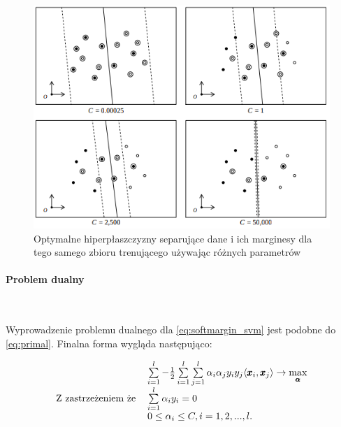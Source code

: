 \documentclass[paper=a4, fontsize=11pt]{scrartcl} %
\numberwithin{equation}{section} %
\numberwithin{figure}{section} %
\newcommand{\myparagraph}[1]{\paragraph{#1}\mbox{}\\}
\begin{document}
    \begin{figure}[H] 
        \begin{center}
            \includegraphics[scale=0.8]{./img/param_c_change.png}
            \caption{Optymalne hiperpłaszczyzny separujące dane i ich marginesy dla tego samego
            zbioru trenującego używając różnych parametrów \cite{nefedov2016support}}
            \label{fig:param_c_change}
        \end{center}
    \end{figure}

\myparagraph{Problem dualny}
    \par Wyprowadzenie problemu dualnego dla \ref{eq:softmargin_svm} jest podobne do
    \ref{eq:primal}. Finalna forma wygląda następująco:

    \begin{equation}
        \begin{tabular}{rl}
            & $\sum\limits_{i=1}^{l} -
            \frac{1}{2}\sum\limits_{i=1}^{l}\sum\limits_{j=1}^{l}\alpha_i\alpha_j y_i y_j
            \langle \pmb{x}_i, \pmb{x}_j \rangle \rightarrow \max\limits_{\pmb{\alpha}}$ \\
            Z zastrzeżeniem że
            & $\sum\limits_{i=1}^{l}\alpha_i y_i = 0$ \\
            & $ 0 \leq \alpha_i \leq C, i=1,2,...,l$.
        \end{tabular}
    \end{equation}
\end{document}
